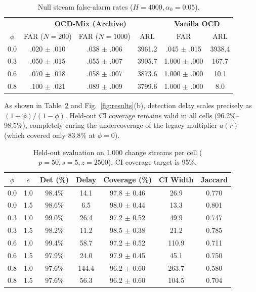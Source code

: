 \documentclass[lettersize,journal]{IEEEtran}
\begin{document}
\begin{table}[h]
\centering
\caption{Null stream false-alarm rates ($H=4000, \alpha_0=0.05$).}
\label{tab:null_results}
\begin{small}
\begin{tabular}{cccccc}
\toprule
& \multicolumn{3}{c}{\textbf{OCD-Mix (Archive)}} & \multicolumn{2}{c}{\textbf{Vanilla OCD}} \\
$\phi$ & FAR ($N=200$) & FAR ($N=1000$) & ARL & FAR & ARL \\
\midrule
0.0 & .020 $\pm$ .010 & .038 $\pm$ .006 & 3961.2 & .045 $\pm$ .015 & 3938.4 \\
0.3 & .050 $\pm$ .015 & .055 $\pm$ .007 & 3905.7 & 1.000 $\pm$ .000 & 167.7 \\
0.6 & .070 $\pm$ .018 & .058 $\pm$ .007 & 3873.6 & 1.000 $\pm$ .000 & 10.1 \\
0.8 & .100 $\pm$ .021 & .089 $\pm$ .009 & 3799.6 & 1.000 $\pm$ .000 & 8.0 \\
\bottomrule
\end{tabular}
\end{small}
\end{table}

As shown in Table~\ref{tab:change_results} and Fig.~\ref{fig:results}(b), detection delay scales precisely as $(1+\phi)/(1-\phi)$. Held-out CI coverage remains valid in all cells (96.2\%--98.5\%), completely curing the undercoverage of the legacy multiplier $a(\bar{r})$ (which covered only 83.8\% at $\phi=0$).

\begin{table}[h]
\centering
\caption{Held-out evaluation on 1,000 change streams per cell ($p=50, s=5, z=2500$). CI coverage target is 95\%.}
\label{tab:change_results}
\begin{small}
\begin{tabular}{ccccccc}
\toprule
$\phi$ & $e$ & Det (\%) & Delay & Coverage (\%) & CI Width & Jaccard \\
\midrule
0.0 & 1.0 & 98.4\% & 14.1 & 97.8 $\pm$ 0.46 & 26.9 & 0.770 \\
0.0 & 1.5 & 98.6\% & 6.5  & 98.0 $\pm$ 0.44 & 13.3 & 0.801 \\
0.3 & 1.0 & 99.0\% & 26.4 & 97.2 $\pm$ 0.52 & 49.9 & 0.747 \\
0.3 & 1.5 & 98.2\% & 11.2 & 98.5 $\pm$ 0.38 & 21.2 & 0.785 \\
0.6 & 1.0 & 99.4\% & 58.7 & 97.2 $\pm$ 0.52 & 110.9 & 0.711 \\
0.6 & 1.5 & 97.9\% & 24.0 & 97.9 $\pm$ 0.45 & 45.1 & 0.750 \\
0.8 & 1.0 & 97.6\% & 144.4& 96.2 $\pm$ 0.60 & 263.7 & 0.580 \\
0.8 & 1.5 & 97.6\% & 56.3 & 96.2 $\pm$ 0.60 & 104.5 & 0.704 \\
\bottomrule
\end{tabular}
\end{small}
\end{table}
\end{document}
